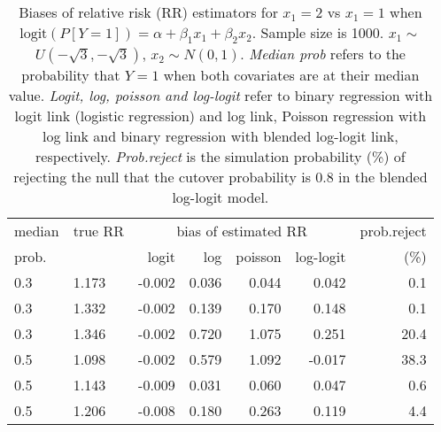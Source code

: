 \documentclass[12pt,a4paper]{article}
\begin{document}
\begin{table}[H] 
\small\sf\centering 
\caption{Biases of relative risk (RR) estimators for $x_1=2$ vs $x_1=1$ when $\mbox{logit}(P[Y=1])=\alpha+\beta_1 x_1 + \beta_2 x_2$. Sample size is 1000. $x_1 \sim $$U(-\sqrt{3},-\sqrt{3})$, $x_2 \sim N(0,1)$. {\it Median prob} refers to the probability that $Y=1$ when both covariates are at their median value. {\it Logit, log, poisson and log-logit} refer to binary regression with logit link (logistic regression) and log link, Poisson regression with log link and binary regression with blended log-logit link, respectively. {\it Prob.reject} is the simulation probability (\%) of rejecting the null that the cutover probability is $0.8$ in the blended log-logit model.} 
\begin{tabular}{llrrrrr} 
\toprule 
median & true RR & \multicolumn{4}{c}{bias of estimated RR} & prob.reject \\ 
prob. & & logit & log & poisson & log-logit  & (\%) \\ \midrule 
0.3 & 1.173 & -0.002 & 0.036 & 0.044 &  0.042 &  0.1 \\  
0.3 & 1.332 & -0.002 & 0.139 & 0.170 &  0.148 &  0.1 \\  
0.3 & 1.346 & -0.002 & 0.720 & 1.075 &  0.251 & 20.4 \\  
0.5 & 1.098 & -0.002 & 0.579 & 1.092 & -0.017 & 38.3 \\  
0.5 & 1.143 & -0.009 & 0.031 & 0.060 &  0.047 &  0.6 \\  
0.5 & 1.206 & -0.008 & 0.180 & 0.263 &  0.119 &  4.4 \\  
\bottomrule 
\end{tabular} 
\end{table} 
\end{document}
